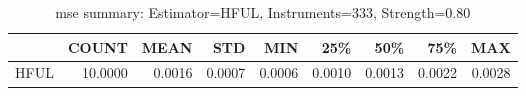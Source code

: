 \begin{table}[ht]
\centering
\caption{mse summary: Estimator=HFUL, Instruments=333, Strength=0.80}
\begin{tabular}{lrrrrrrrr}
\toprule
 & COUNT & MEAN & STD & MIN & 25\% & 50\% & 75\% & MAX \\
\midrule
HFUL & 10.0000 & 0.0016 & 0.0007 & 0.0006 & 0.0010 & 0.0013 & 0.0022 & 0.0028 \\
\bottomrule
\end{tabular}
\end{table}
